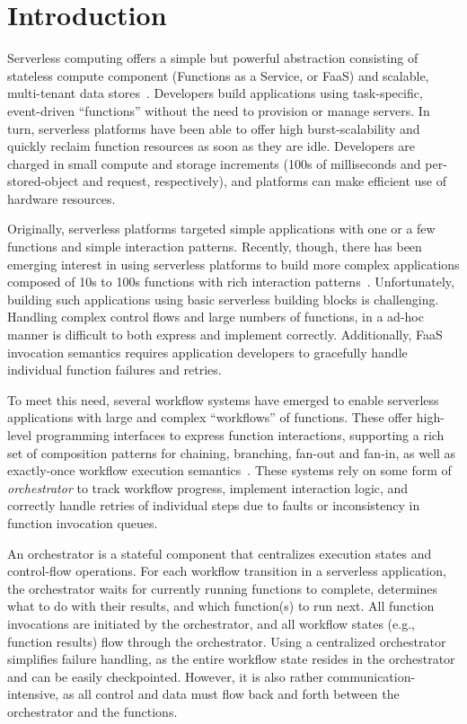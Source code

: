 \section{Introduction}

Serverless computing offers a simple but powerful abstraction consisting of
stateless compute component (Functions as a Service, or FaaS) and scalable,
multi-tenant data stores~\cite{berkeley}. Developers build applications using
task-specific, event-driven ``functions'' without the need to provision or
manage servers. In turn, serverless platforms have been able to offer high
burst-scalability and quickly reclaim function resources as soon as they are
idle. Developers are charged in small compute and storage increments (100s of
milliseconds and per-stored-object and request, respectively), and platforms
can make efficient use of hardware resources.

Originally, serverless platforms targeted simple applications with one or a few
functions and simple interaction patterns. Recently, though, there has been
emerging interest in using serverless platforms to build more complex
applications composed of 10s to 100s functions with rich interaction
patterns~\cite{excamera, pywren, gg-atc, beldi, boki}. Unfortunately, building
such applications using basic serverless building blocks is challenging.
Handling complex control flows and large numbers of functions, in a ad-hoc
manner is difficult to both express and implement correctly.  Additionally, FaaS
invocation semantics requires application developers to gracefully handle
individual function failures and retries.

To meet this need, several workflow systems have emerged to enable serverless
applications with large and complex ``workflows'' of functions. These offer
high-level programming interfaces to express function interactions, supporting a
rich set of composition patterns for chaining, branching, fan-out and fan-in, as
well as exactly-once workflow execution semantics~\cite{excamera, gg-atc,
aws-step-functions, google-cloud-composer, google-workflows, durable-functions}.
These systems rely on some form of \emph{orchestrator} to track workflow
progress, implement interaction logic, and correctly handle retries of
individual steps due to faults or inconsistency in function invocation queues.

An orchestrator is a stateful component that centralizes execution states
and control-flow operations. For each workflow transition in a serverless
application, the orchestrator waits for currently running functions to complete,
determines what to do with their results, and which function(s) to run
next. All function invocations are initiated by the orchestrator, and all
workflow states (e.g., function results) flow through the orchestrator. Using a 
centralized orchestrator simplifies failure handling, as the entire workflow state resides
in the orchestrator and can be easily checkpointed. However, it is also rather
communication-intensive, as all control and data must flow back and forth between
the orchestrator and the functions.

